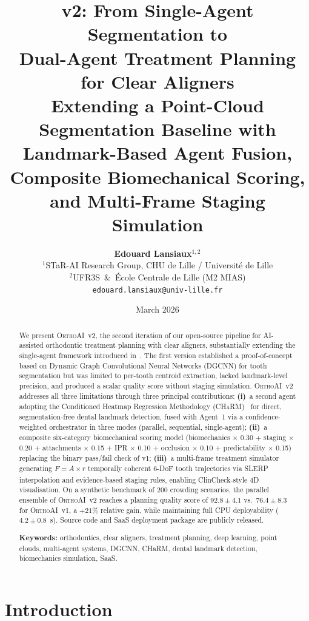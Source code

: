 \documentclass[10pt,twocolumn]{article}
\title{
  \textbf{\orthoai{} v2: From Single-Agent Segmentation to\\
  Dual-Agent Treatment Planning for Clear Aligners}\\
  \vspace{0.35em}
  \large Extending a Point-Cloud Segmentation Baseline
  with Landmark-Based Agent Fusion,\\
  Composite Biomechanical Scoring, and Multi-Frame Staging Simulation
}
\author{
  \textbf{Edouard Lansiaux}$^{1,2}$ \\[2pt]
  $^{1}$STaR-AI Research Group, CHU de Lille / Université de Lille \\
  $^{2}$UFR3S~\&~École Centrale de Lille (M2 MIAS) \\[2pt]
  \texttt{edouard.lansiaux@univ-lille.fr}
}
\date{March 2026}
\newcommand{\orthoai}{\textsc{OrthoAI}}
\newcommand{\charm}{\textsc{CHaRM}}
\newcommand{\dgcnn}{\textsc{DGCNN}}
\newcommand{\vone}{\orthoai{}~v1}
\newcommand{\vtwo}{\orthoai{}~v2}
\begin{document}
\maketitle

\begin{abstract}
We present \vtwo{}, the second iteration of our open-source pipeline for
AI-assisted orthodontic treatment planning with clear aligners, substantially
extending the single-agent framework introduced in~\cite{lansiaux2026orthoaiv1}.
The first version established a proof-of-concept based on Dynamic Graph
Convolutional Neural Networks (\dgcnn{}) for tooth segmentation but was
limited to per-tooth centroid extraction, lacked landmark-level precision,
and produced a scalar quality score without staging simulation.
\vtwo{} addresses all three limitations through three principal contributions:
\textbf{(i)}~a second agent adopting the Conditioned Heatmap Regression
Methodology (\charm{})~\cite{rodriguez2025charm} for direct, segmentation-free
dental landmark detection, fused with Agent~1 via a confidence-weighted
orchestrator in three modes (parallel, sequential, single-agent);
\textbf{(ii)}~a composite six-category biomechanical scoring model
(biomechanics $\times$ 0.30 + staging $\times$ 0.20 + attachments $\times$ 0.15
+ IPR $\times$ 0.10 + occlusion $\times$ 0.10 + predictability $\times$ 0.15)
replacing the binary pass/fail check of v1;
\textbf{(iii)}~a multi-frame treatment simulator generating $F = A \times r$
temporally coherent 6-DoF tooth trajectories via SLERP interpolation
and evidence-based staging rules, enabling ClinCheck\textsuperscript{\textregistered}-style
4D visualisation.
On a synthetic benchmark of 200 crowding scenarios,
the parallel ensemble of \vtwo{} reaches a planning quality score of
$92.8 \pm 4.1$ vs.\ $76.4 \pm 8.3$ for \vone{}, a $+21\%$ relative gain,
while maintaining full CPU deployability ($4.2 \pm 0.8$~s).
Source code and SaaS deployment package are publicly released.

\smallskip
\noindent\textbf{Keywords:} orthodontics, clear aligners, treatment planning,
deep learning, point clouds, multi-agent systems, DGCNN, CHaRM,
dental landmark detection, biomechanics simulation, SaaS.
\end{abstract}

\section{Introduction}
\label{sec:intro}
\end{document}
